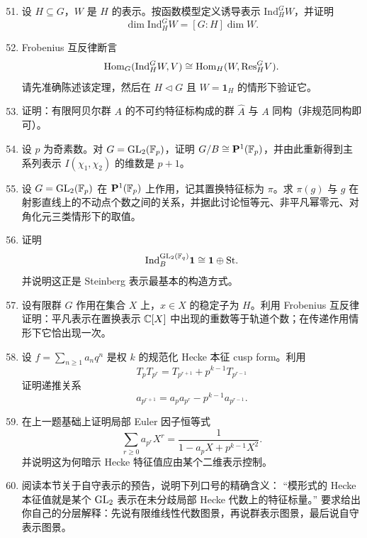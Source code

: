 \begin{enumerate}[label={\textbf{习题8.\arabic*.}}, wide=0pt, leftmargin=3.2em]
\setcounter{enumi}{50}

\item \hard 设 $H\subseteq G$，$W$ 是 $H$ 的表示。按函数模型定义诱导表示 $\mathrm{Ind}_H^G W$，并证明
\[
\dim \mathrm{Ind}_H^G W=[G:H]\dim W.
\]

\item \hard Frobenius 互反律断言
\[
\mathrm{Hom}_G(\mathrm{Ind}_H^G W,V)\cong \mathrm{Hom}_H(W,\mathrm{Res}_H^G V).
\]
请先准确陈述该定理，然后在 $H\triangleleft G$ 且 $W=\mathbf{1}_H$ 的情形下验证它。

\item \hard 证明：有限阿贝尔群 $A$ 的不可约特征标构成的群 $\widehat{A}$ 与 $A$ 同构（非规范同构即可）。

\item \hard 设 $p$ 为奇素数。对 $G=\mathrm{GL}_2(\mathbb{F}_p)$，证明 $G/B\cong \mathbf{P}^1(\mathbb{F}_p)$，并由此重新得到主系列表示 $I(\chi_1,\chi_2)$ 的维数是 $p+1$。

\item \hard 设 $G=\mathrm{GL}_2(\mathbb{F}_p)$ 在 $\mathbf{P}^1(\mathbb{F}_p)$ 上作用，记其置换特征标为 $\pi$。求 $\pi(g)$ 与 $g$ 在射影直线上的不动点个数之间的关系，并据此讨论恒等元、非平凡幂零元、对角化元三类情形下的取值。

\item \hard 证明
\[
\mathrm{Ind}_B^{\mathrm{GL}_2(\mathbb{F}_q)}\mathbf{1}\cong \mathbf{1}\oplus \mathrm{St}.
\]
并说明这正是 Steinberg 表示最基本的构造方式。

\item \hard 设有限群 $G$ 作用在集合 $X$ 上，$x\in X$ 的稳定子为 $H$。利用 Frobenius 互反律证明：平凡表示在置换表示 $\mathbb{C}[X]$ 中出现的重数等于轨道个数；在传递作用情形下它恰出现一次。

\item \hard 设 $f=\sum_{n\ge 1}a_nq^n$ 是权 $k$ 的规范化 Hecke 本征 cusp form。利用
\[
T_pT_{p^r}=T_{p^{r+1}}+p^{k-1}T_{p^{r-1}}
\]
证明递推关系
\[
a_{p^{r+1}}=a_pa_{p^r}-p^{k-1}a_{p^{r-1}}.
\]

\item \hard 在上一题基础上证明局部 Euler 因子恒等式
\[
\sum_{r\ge 0}a_{p^r}X^r=\frac{1}{1-a_pX+p^{k-1}X^2}.
\]
并说明这为何暗示 Hecke 特征值应由某个二维表示控制。

\item \hard 阅读本节关于自守表示的预告，说明下列口号的精确含义：
“模形式的 Hecke 本征值就是某个 $\mathrm{GL}_2$ 表示在未分歧局部 Hecke 代数上的特征标量。”
要求给出你自己的分层解释：先说有限维线性代数图景，再说群表示图景，最后说自守表示图景。
\end{enumerate}
